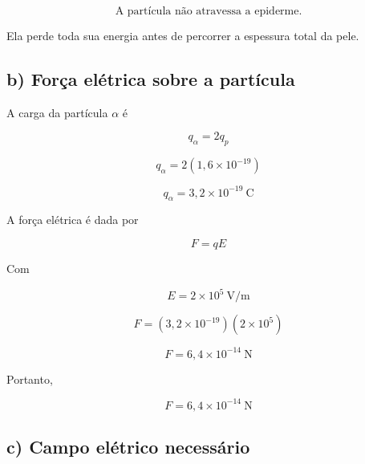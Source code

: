 \documentclass[a4paper,12pt]{article}
\begin{document}
\begin{equation}
\boxed{\text{A partícula não atravessa a epiderme.}}
\end{equation}

Ela perde toda sua energia antes de percorrer a espessura total da pele.

\hrulefill

\subsection*{b) Força elétrica sobre a partícula}

A carga da partícula $\alpha$ é

\begin{equation}
q_\alpha = 2q_p
\end{equation}

\begin{equation}
q_\alpha = 2(1{,}6\times10^{-19})
\end{equation}

\begin{equation}
q_\alpha = 3{,}2\times10^{-19} \ \text{C}
\end{equation}

A força elétrica é dada por

\begin{equation}
F = qE
\end{equation}

Com

\begin{equation}
E = 2\times10^5 \ \text{V/m}
\end{equation}

\begin{equation}
F = (3{,}2\times10^{-19})(2\times10^5)
\end{equation}

\begin{equation}
F = 6{,}4\times10^{-14} \ \text{N}
\end{equation}

Portanto,

\begin{equation}
\boxed{F = 6{,}4\times10^{-14} \ \text{N}}
\end{equation}

\hrulefill

\subsection*{c) Campo elétrico necessário}
\end{document}
